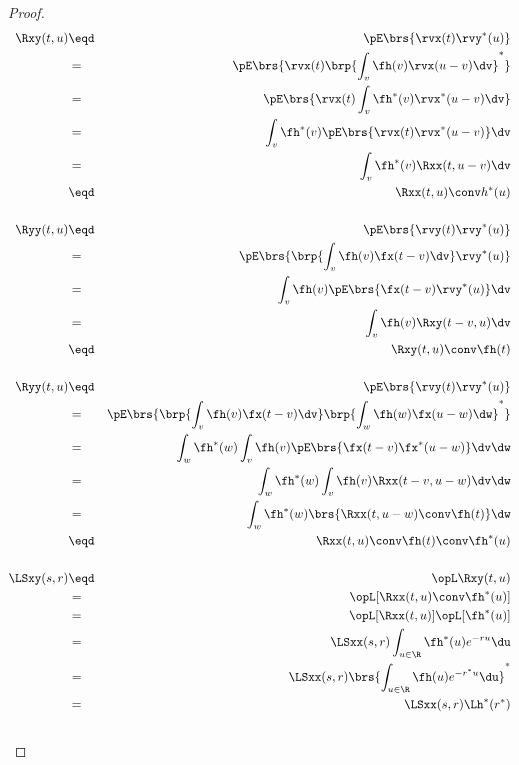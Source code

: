\begin{proof}
\begin{eqnarray*}
   \Rxy(t,u)
     &\eqd& \pE\brs{\rvx(t) \rvy^\ast(u) }
   \\&=&    \pE\brs{\rvx(t) \brp{ \int_v \fh(v) \rvx(u-v)  \dv }^\ast }
   \\&=&    \pE\brs{\rvx(t) \int_v \fh^\ast(v) \rvx^\ast(u-v)  \dv }
   \\&=&    \int_v \fh^\ast(v)  \pE\brs{\rvx(t)\rvx^\ast(u-v)} \dv
   \\&=&    \int_v \fh^\ast(v)  \Rxx(t,u-v)  \dv
   \\&\eqd& \Rxx(t,u) \conv h^\ast(u)
\\ \\
   \Ryy(t,u)
     &\eqd& \pE\brs{\rvy(t) \rvy^\ast(u) }
   \\&=&    \pE\brs{\brp{\int_v \fh(v) \fx(t-v)\dv}  \rvy^\ast(u) }
   \\&=&    \int_v \fh(v) \pE\brs{\fx(t-v)\rvy^\ast(u)} \dv
   \\&=&    \int_v \fh(v) \Rxy(t-v,u) \dv
   \\&\eqd& \Rxy(t,u) \conv \fh(t)
\\ \\
   \Ryy(t,u)
     &\eqd& \pE\brs{\rvy(t) \rvy^\ast(u) }
   \\&=&    \pE\brs{\brp{\int_v \fh(v) \fx(t-v)\dv}
                    \brp{\int_w \fh(w) \fx(u-w)\dw}^\ast
              }
   \\&=&    \int_w \fh^\ast(w) \int_v \fh(v)
                   \pE\brs{\fx(t-v)\fx^\ast(u-w)} \dv\dw
   \\&=&    \int_w \fh^\ast(w) \int_v \fh(v)
                   \Rxx(t-v,u-w) \dv\dw
   \\&=&    \int_w \fh^\ast(w) \brs{\Rxx(t,u-w)\conv\fh(t)}\dw
   \\&\eqd& \Rxx(t,u) \conv \fh(t) \conv \fh^\ast(u)
\\ \\
   \LSxy(s,r)
     &\eqd& \opL\Rxy(t,u)
   \\&=&    \opL[\Rxx(t,u) \conv \fh^\ast(u)]
   \\&=&    \opL[\Rxx(t,u)]\opL[\fh^\ast(u)]
   \\&=&    \LSxx(s,r)  \int_{u\in\R}\fh^\ast(u) e^{-ru}\du
   \\&=&    \LSxx(s,r)  \brs{\int_{u\in\R}\fh(u) e^{-r^\ast u}\du }^\ast
   \\&=&    \LSxx(s,r) \Lh^\ast(r^\ast)
\\ \\

\end{eqnarray*}
\end{proof}
